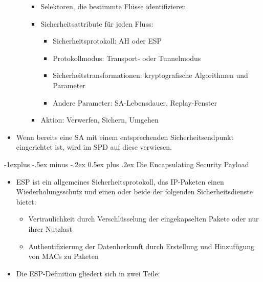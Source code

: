 \documentclass[a4paper]{article}
\makeatletter
\renewcommand{\subsection}{\@startsection{subsection}{2}{0mm}%
 {-1explus -.5ex minus -.2ex}%
 {0.5ex plus .2ex}%
 {\normalfont\normalsize\bfseries}}
\makeatother
\begin{document}
\begin{multicols}{3}
\begin{itemize}
\begin{itemize}
                        \begin{itemize}
                            \item
                                  Selektoren, die bestimmte Flüsse identifizieren
                            \item
                                  Sicherheitsattribute für jeden Fluss:

                                  \begin{itemize}
                                      \item
                                            Sicherheitsprotokoll: AH oder ESP
                                      \item
                                            Protokollmodus: Transport- oder Tunnelmodus
                                      \item
                                            Sicherheitstransformationen: kryptografische Algorithmen und
                                            Parameter
                                      \item
                                            Andere Parameter: SA-Lebensdauer, Replay-Fenster
                                  \end{itemize}
                            \item
                                  Aktion: Verwerfen, Sichern, Umgehen
                        \end{itemize}
              \end{itemize}
        \item
              Wenn bereits eine SA mit einem entsprechenden Sicherheitsendpunkt
              eingerichtet ist, wird im SPD auf diese verwiesen.
    \end{itemize}


    \subsection{Die Encapsulating Security
        Payload}

    \begin{itemize}
        \item
              ESP ist ein allgemeines Sicherheitsprotokoll, das IP-Paketen einen
              Wiederholungsschutz und einen oder beide der folgenden
              Sicherheitsdienste bietet:

              \begin{itemize}
                  \item
                        Vertraulichkeit durch Verschlüsselung der eingekapselten Pakete oder
                        nur ihrer Nutzlast
                  \item
                        Authentifizierung der Datenherkunft durch Erstellung und Hinzufügung
                        von MACs zu Paketen
              \end{itemize}
        \item
              Die ESP-Definition gliedert sich in zwei Teile:


\end{itemize}
\end{multicols}
\end{document}
